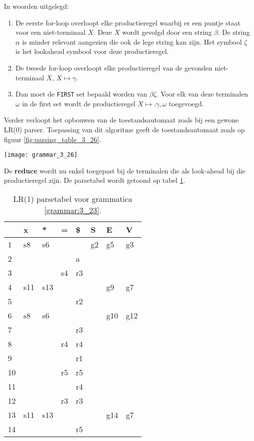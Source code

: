 In woorden uitgelegd: 
\begin{enumerate}
	\item De eerste for-loop overloopt elke productieregel waarbij er een puntje staat voor een niet-terminaal $X$. Deze $X$ wordt gevolgd door een string $\beta$. De string $\alpha$ is minder relevant aangezien die ook de lege string kan zijn. Het symbool $\zeta$ is het lookahead symbool voor deze productieregel. 
	\item De tweede for-loop overloopt elke productieregel van de gevonden niet-terminaal $X$, $X \mapsto \gamma$.
	\item Dan moet de \texttt{FIRST} set bepaald worden van $\beta\zeta$. Voor elk van deze terminalen $\omega$ in de first set wordt de productieregel $X \mapsto .\gamma, \omega$ toegevoegd.
\end{enumerate}

Verder verloopt het opbouwen van de toestandsautomaat zoals bij een gewone LR(0) parser. Toepassing van dit algoritme geeft de toestandsautomaat zoals op figuur \ref{fig:parsing_table_3_26}.
\begin{grammarfigure}
	\centering
	\texttt{[image: grammar\_3\_26]}
	\caption{}
	\label{grammar:3_26}
\end{grammarfigure}

De \textbf{reduce} wordt nu enkel toegepast bij de terminalen die als look-ahead bij die productieregel zijn. De parsetabel wordt getoond op tabel \ref{table:slr_parse_table_3_26_LR1}.

\begin{table}[ht]
	\centering
	\begin{tabular}{l|llll|lll|}
		  & x   & *  & = & \$ & S  & E  & V \\
		\hline
		1 & s8  & s6 &   &    & g2 & g5 & g3 \\
		2 &     &    &   &  a &    &    &    \\
		3 &     &    & s4& r3 &    &    &    \\
		4 & s11 & s13&   &    &    & g9 &  g7  \\
		5 &     &    &   & r2 &    &    &    \\
		6 & s8  & s6 &   &    &    & g10& g12\\
		7 &     &    &   & r3 &    &    &    \\
		8 &     &    &r4 & r4 &    &    &    \\
		9 &     &    &   & r1 &    &    &    \\
		10 &     &    & r5& r5 &    &    &    \\
		11 &     &    &   &  r4&    &    &    \\
		12 &     &    & r3& r3 &    &    &    \\
		13 & s11 & s13&   &    &    & g14 & g7   \\
		14 &     &    &   &  r5  &    &    &    \\
		\hline
	\end{tabular}
	\caption{LR(1) parsetabel voor grammatica \ref{grammar:3_23}.}
	\label{table:slr_parse_table_3_26_LR1}
\end{table}


